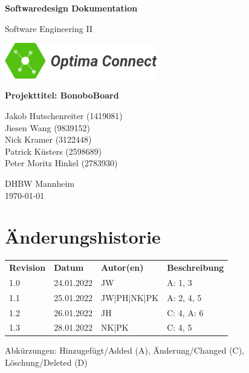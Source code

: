 \documentclass[a4paper,11pt]{scrartcl}
\begin{document}
\renewcommand*{\arraystretch}{1.2}
\begin{titlepage}
    \begin{center}
        \vspace*{1cm}\Huge
        \textbf{Softwaredesign Dokumentation}\par                
        \vspace{0.5cm}\LARGE        
        Software Engineering II\par           
        \vspace{2cm}
        \includegraphics[width=0.5\textwidth]{OptimaLogo_long}\par   
        \vspace{1cm}
        \textbf{Projekttitel: BonoboBoard}\par        
        \vfill\Large   
        Jakob Hutschenreiter (1419081)\\Jiesen Wang (9839152)\\Nick Kramer (3122448)\\Patrick Küsters (2598689)\\Peter Moritz Hinkel (2783930)\par
        \vspace{2cm}
        DHBW Mannheim\\
        \today     
    \end{center}
\end{titlepage}

\section*{Änderungshistorie}
\begin{table}[h]
	\begin{tabular}{@{} p{20mm} p{25mm} p{25mm} p{75mm}}
		\textbf{Revision} & \textbf{Datum} & \textbf{Autor(en)} & \textbf{Beschreibung}\\
		1.0 & 24.01.2022 & JW & A: 1, 3 \\ 
		1.1 & 25.01.2022 & JW|PH|NK|PK & A: 2, 4, 5  \\ 
        1.2 & 26.01.2022 & JH & C: 4, A: 6 \\ 
        1.3 & 28.01.2022 & NK|PK & C: 4, 5 \\ 
	\end{tabular}
\end{table}
\noindent
Abkürzungen: Hinzugefügt/Added (A), Änderung/Changed (C), Löschung/Deleted (D)
\vspace{2cm}
\tableofcontents
\newpage
{}
\end{document}
